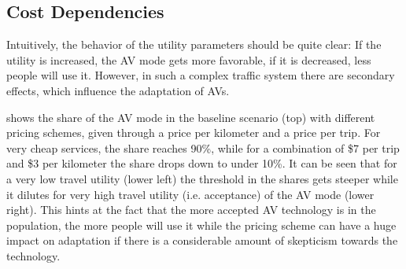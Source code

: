 \subsection{Cost Dependencies}
\label{sec:costs}

Intuitively, the behavior of the utility parameters should be quite clear: If
the utility is increased, the AV mode gets more favorable, if it is decreased, less
people will use it. However, in such a complex traffic system there are secondary
effects, which influence the adaptation of AVs.

 shows the share of the AV mode in the baseline scenario (top)
with different pricing schemes, given through a price per kilometer and a price
per trip. For very cheap services, the share reaches 90\%, while for a combination
of \$7 per trip and \$3 per kilometer the share drops down to under 10\%. It can
be seen that for a very low travel utility (lower left) the threshold in the shares
gets steeper while it dilutes for  very high travel utility (i.e. acceptance)
of the AV mode (lower right). This hints at the fact that the more accepted AV
technology is in the population, the more people will use it while the pricing
scheme can have a huge impact on adaptation if there is a considerable amount of
skepticism towards the technology.

